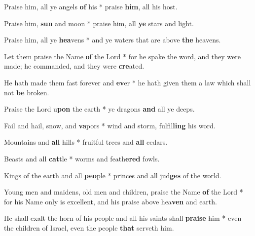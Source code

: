 \begin{multicols}{2}
	Praise him, all ye angels \textbf{of} his * praise \textbf{him}, all his host.
	
	Praise him, \textbf{sun} and moon * praise him, all \textbf{ye} stars and light.
	
	Praise him, all ye \textbf{hea}vens * and ye waters that are above \textbf{the} heavens.
	
	Let them praise the Name \textbf{of} the Lord * for he spake the word, and they were made; he commanded, and they were \textbf{cre}ated.
	
	He hath made them fast forever and \textbf{ev}er * he hath given them a law which shall not \textbf{be} broken.
	
	Praise the Lord u\textbf{pon} the earth * ye dragons \textbf{and} all ye deeps.
	
	Fail and hail, snow, and \textbf{va}pors * wind and storm, fulfil\textbf{ling} his word.
	
	Mountains and \textbf{all} hills * fruitful trees and \textbf{all} cedars.
	
	Beasts and all \textbf{cat}tle * worms and feath\textbf{ered} fowls.
	
	Kings of the earth and all \textbf{peo}ple * princes and all jud\textbf{ges} of the world.
	
	Young men and maidens, old men and children, praise the Name \textbf{of} the Lord * for his Name only is excellent, and his praise above hea\textbf{ven} and earth.
	
	He shall exalt the horn of his people and all his saints shall \textbf{praise} him * even the children of Israel, even the people \textbf{that} serveth him.
\end{multicols}